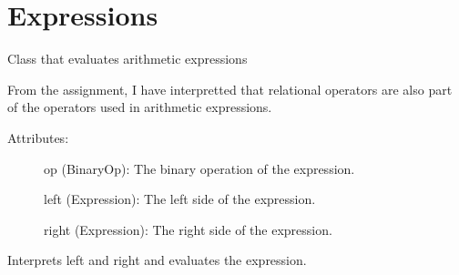 \documentclass[letterpaper,10pt,english]{sphinxmanual}
\begin{document}
\chapter{Expressions}
\label{\detokenize{expressions:module-robol_lang.expressions}}\label{\detokenize{expressions:expressions}}\label{\detokenize{expressions::doc}}

\begin{fulllineitems}
\label{\detokenize{expressions:robol_lang.expressions.ArithmeticExp}}
\sphinxAtStartPar
Class that evaluates arithmetic expressions

\sphinxAtStartPar
From the assignment, I have interpretted that relational operators are also
part of the operators used in arithmetic expressions.
\begin{description}
\item[{Attributes:}] \leavevmode
\sphinxAtStartPar
op (BinaryOp): The binary operation of the expression.

\sphinxAtStartPar
left (Expression): The left side of the expression.

\sphinxAtStartPar
right (Expression): The right side of the expression.

\end{description}

\begin{fulllineitems}
\label{\detokenize{expressions:robol_lang.expressions.ArithmeticExp.interpret}}
\sphinxAtStartPar
Interprets left and right and evaluates the expression.


\end{fulllineitems}
\end{fulllineitems}
\end{document}
